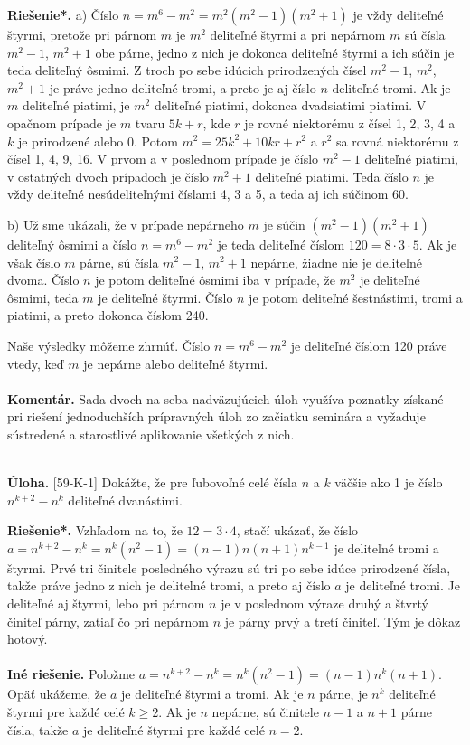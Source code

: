 \documentclass[11pt,a4paper,oneside,final]{book}
\newcommand{\kom}{\textbf{Komentár.} }
\newcommand{\ul}{\textbf{Úloha.} }
\newcommand{\rieh}{\textbf{Riešenie*.} }
\begin{document}
\rieh a) Číslo $n = m^6 -m^2 = m^2 (m^2-1)(m^2 +1)$ je vždy deliteľné štyrmi, pretože pri párnom $m$ je $m^2$ deliteľné štyrmi a pri nepárnom $m$ sú čísla $m^2-1$, $m^2 +1$ obe párne, jedno z nich je dokonca deliteľné štyrmi a ich súčin je teda deliteľný ôsmimi. Z troch po sebe idúcich prirodzených čísel $m^2-1$, $m^2$, $m^2 + 1$ je práve jedno deliteľné tromi, a preto je aj číslo $n$ deliteľné tromi. Ak je $m$ deliteľné piatimi, je $m^2$ deliteľné piatimi, dokonca dvadsiatimi piatimi. V opačnom prípade je $m$ tvaru $5k + r$, kde $r$ je rovné niektorému z čísel 1, 2, 3, 4 a $k$ je prirodzené alebo 0. Potom $m^2 = 25k^2 + 10kr + r^2$ a $r^2$ sa rovná niektorému z čísel 1, 4, 9, 16. V prvom a v poslednom prípade je číslo $m^2-1$ deliteľné piatimi, v ostatných dvoch prípadoch je číslo $m^2 + 1$ deliteľné piatimi. Teda číslo $n$ je vždy deliteľné nesúdeliteľnými číslami 4, 3 a 5, a teda aj ich súčinom 60.

b) Už sme ukázali, že v prípade nepárneho $m$ je súčin $(m^2-1)(m^2 + 1)$ deliteľný ôsmimi a číslo $n = m^6- m^2$ je teda deliteľné číslom $120 = 8 \cdot 3 \cdot 5$. Ak je však číslo $m$ párne, sú čísla $m^2 -1$, $m^2 + 1$ nepárne, žiadne nie je deliteľné dvoma. Číslo $n$ je potom deliteľné ôsmimi iba v prípade, že $m^2$ je deliteľné ôsmimi, teda $m$ je deliteľné štyrmi. Číslo $n$ je potom deliteľné šestnástimi, tromi a piatimi, a preto dokonca číslom 240.

Naše výsledky môžeme zhrnúť. Číslo $n = m^6 - m^2$ je deliteľné číslom 120 práve vtedy, keď $m$ je nepárne alebo deliteľné štyrmi.\\
\\
\kom Sada dvoch na seba nadväzujúcich úloh využíva poznatky získané pri riešení jednoduchších prípravných úloh zo začiatku seminára a vyžaduje sústredené a starostlivé aplikovanie všetkých z nich.\\
\\
\begin{tcolorbox}[breakable,notitle,boxrule=0pt,colback=light-gray,colframe=light-gray]\ul [59-K-1]
Dokážte, že pre ľubovoľné celé čísla $n$ a $k$ väčšie ako 1 je číslo $n^{k+2} - n^k$ deliteľné dvanástimi.

\end{tcolorbox}

\rieh Vzhľadom na to, že $12 = 3 \cdot 4$, stačí ukázať, že číslo $a = n^{k+2} -  {n^k} = n^k (n^2 - 1) = (n - 1)n(n + 1)n^{k-1}$ je deliteľné tromi a štyrmi. Prvé tri činitele posledného výrazu sú tri po sebe idúce prirodzené čísla, takže práve jedno z nich je deliteľné tromi, a preto aj číslo $a$ je deliteľné tromi. Je deliteľné aj štyrmi, lebo pri párnom $n$ je v poslednom výraze druhý a štvrtý činiteľ párny, zatiaľ čo pri nepárnom $n$ je párny prvý a tretí činiteľ. Tým je dôkaz hotový.\\
\\
\textbf{Iné riešenie.} Položme $a = n^{k+2} - n^k = n^k (n^2 - 1) = (n - 1)n^k (n + 1)$. Opäť ukážeme, že $a$ je deliteľné štyrmi a tromi. Ak je $n$ párne, je $n^k$ deliteľné štyrmi pre každé celé $k \geq 2$. Ak je $n$ nepárne, sú činitele $n - 1$ a $n + 1$ párne čísla, takže $a$ je deliteľné štyrmi pre každé celé $n = 2$.
\end{document}
